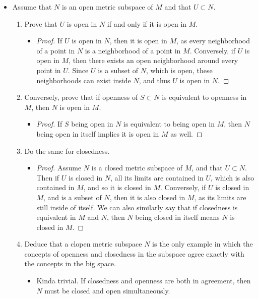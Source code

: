 \documentclass[11pt,a4paper]{article}
\newcommand{\pnum}[1]{\item[\textbf{#1}]}
\begin{document}
\begin{itemize}
	\pnum{2.25} Assume that $N$ is an open metric subspace of $M$ and that $U \subset N$.
	\begin{enumerate}[label=\alph*)]
		\item Prove that $U$ is open in $N$ if and only if it is open in $M$.
			\begin{itemize}
				\item[] \begin{proof}
						If $U$ is open in $N$, then it is open in $M$, as every neighborhood of a point in $N$
						is a neighborhood of a point in $M$. Conversely, if $U$ is open in $M$, then there exists
						an open neighborhood around every point in $U$. Since $U$ is a subset of $N$, which is open,
						these neighborhoods can exist inside $N$, and thus $U$ is open in $N$.
					\end{proof}
			\end{itemize}
		\item Conversely, prove that if openness of $S \subset N$ is equivalent to openness in $M$, then
			$N$ is open in $M$.
			\begin{itemize}
				\item[] \begin{proof}
						If $S$ being open in $N$ is equivalent to being open in $M$, then $N$ being open in itself
						implies it is open in $M$ as well.
				\end{proof}
			\end{itemize}

		\item Do the same for closedness.
			\begin{itemize}
				\item[] \begin{proof}
						Assume $N$ is a closed metric subspace of $M$, and that $U \subset N$. Then if $U$ is closed
						in $N$, all its limits are contained in $U$, which is also contained in $M$, and so it is
						closed in $M$. Conversely, if $U$ is closed in $M$, and is a subset of $N$, then it is also
						closed in $M$, as its limits are still inside of itself. We can also similarly say that if
						closedness is equivalent in $M$ and $N$, then $N$ being closed in itself means $N$ is closed
						in $M$.
					\end{proof}
			\end{itemize}
		\item Deduce that a clopen metric subspace $N$ is the only example in which the concepts of openness
			and closedness in the subspace agree exactly with the concepts in the big space.
			\begin{itemize}
				\item[] Kinda trivial. If closedness and openness are both in agreement, then $N$ must be closed
					and open simultaneously.
			\end{itemize}
	\end{enumerate}


\end{itemize}
\end{document}
